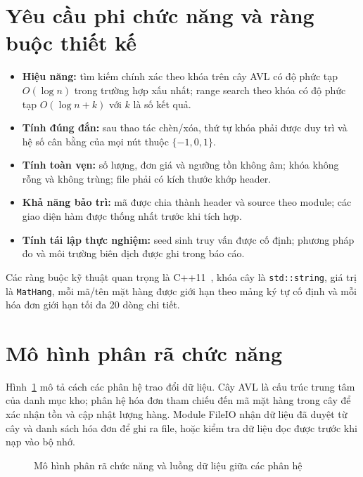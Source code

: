 \section{Yêu cầu phi chức năng và ràng buộc thiết kế}
\begin{itemize}
  \item \textbf{Hiệu năng:} tìm kiếm chính xác theo khóa trên cây AVL có độ phức tạp $O(\log n)$ trong trường hợp xấu nhất; range search theo khóa có độ phức tạp $O(\log n+k)$ với $k$ là số kết quả.
  \item \textbf{Tính đúng đắn:} sau thao tác chèn/xóa, thứ tự khóa phải được duy trì và hệ số cân bằng của mọi nút thuộc $\{-1,0,1\}$.
  \item \textbf{Tính toàn vẹn:} số lượng, đơn giá và ngưỡng tồn không âm; khóa không rỗng và không trùng; file phải có kích thước khớp header.
  \item \textbf{Khả năng bảo trì:} mã được chia thành header và source theo module; các giao diện hàm được thống nhất trước khi tích hợp.
  \item \textbf{Tính tái lập thực nghiệm:} seed sinh truy vấn được cố định; phương pháp đo và môi trường biên dịch được ghi trong báo cáo.
\end{itemize}
Các ràng buộc kỹ thuật quan trọng là C++11~\cite{stroustrup}, khóa cây là \texttt{std::string}, giá trị là \texttt{MatHang}, mỗi mã/tên mặt hàng được giới hạn theo mảng ký tự cố định và mỗi hóa đơn giới hạn tối đa 20 dòng chi tiết.

\section{Mô hình phân rã chức năng}
Hình~\ref{fig:phanhe_tongquan} mô tả cách các phân hệ trao đổi dữ liệu. Cây AVL là cấu trúc trung tâm của danh mục kho; phân hệ hóa đơn tham chiếu đến mã mặt hàng trong cây để xác nhận tồn và cập nhật lượng hàng. Module FileIO nhận dữ liệu đã duyệt từ cây và danh sách hóa đơn để ghi ra file, hoặc kiểm tra dữ liệu đọc được trước khi nạp vào bộ nhớ.
\begin{figure}[H]
\centering
{}
\caption{Mô hình phân rã chức năng và luồng dữ liệu giữa các phân hệ}
\label{fig:phanhe_tongquan}
\end{figure}

